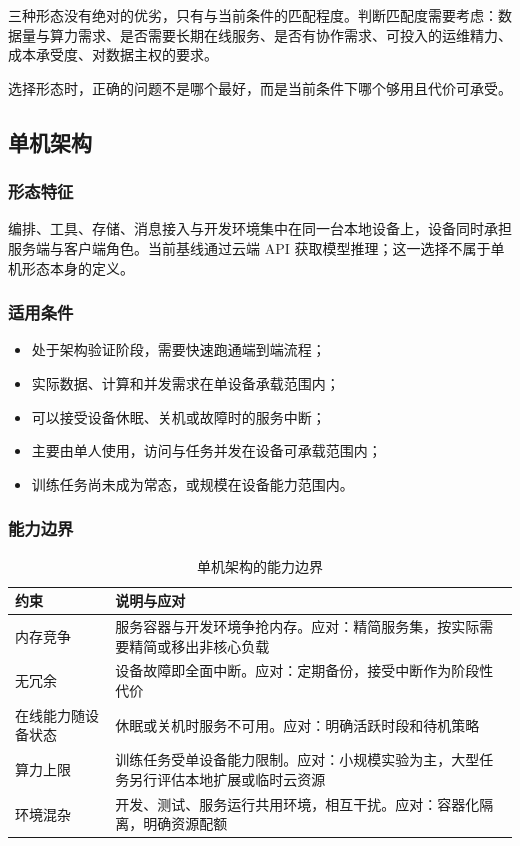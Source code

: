 \documentclass[11pt,a4paper]{article}
\begin{document}
三种形态没有绝对的优劣，只有与当前条件的匹配程度。判断匹配度需要考虑：数据量与算力需求、是否需要长期在线服务、是否有协作需求、可投入的运维精力、成本承受度、对数据主权的要求。

选择形态时，正确的问题不是哪个最好，而是当前条件下哪个够用且代价可承受。

\subsection{单机架构}

\subsubsection{形态特征}

编排、工具、存储、消息接入与开发环境集中在同一台本地设备上，设备同时承担服务端与客户端角色。当前基线通过云端 API 获取模型推理；这一选择不属于单机形态本身的定义。

\subsubsection{适用条件}

\begin{itemize}[leftmargin=2em,itemsep=2pt]
  \item 处于架构验证阶段，需要快速跑通端到端流程；
  \item 实际数据、计算和并发需求在单设备承载范围内；
  \item 可以接受设备休眠、关机或故障时的服务中断；
  \item 主要由单人使用，访问与任务并发在设备可承载范围内；
  \item 训练任务尚未成为常态，或规模在设备能力范围内。
\end{itemize}

\subsubsection{能力边界}

\begin{table}[H]
\centering
\renewcommand{\arraystretch}{1.35}
\begin{tabularx}{\textwidth}{P{3cm} L}
\toprule
\textbf{约束} & \textbf{说明与应对} \\
\midrule
内存竞争 & 服务容器与开发环境争抢内存。应对：精简服务集，按实际需要精简或移出非核心负载 \\
无冗余 & 设备故障即全面中断。应对：定期备份，接受中断作为阶段性代价 \\
在线能力随设备状态 & 休眠或关机时服务不可用。应对：明确活跃时段和待机策略 \\
算力上限 & 训练任务受单设备能力限制。应对：小规模实验为主，大型任务另行评估本地扩展或临时云资源 \\
环境混杂 & 开发、测试、服务运行共用环境，相互干扰。应对：容器化隔离，明确资源配额 \\
\bottomrule
\end{tabularx}
\caption{单机架构的能力边界}
\end{table}
\end{document}
